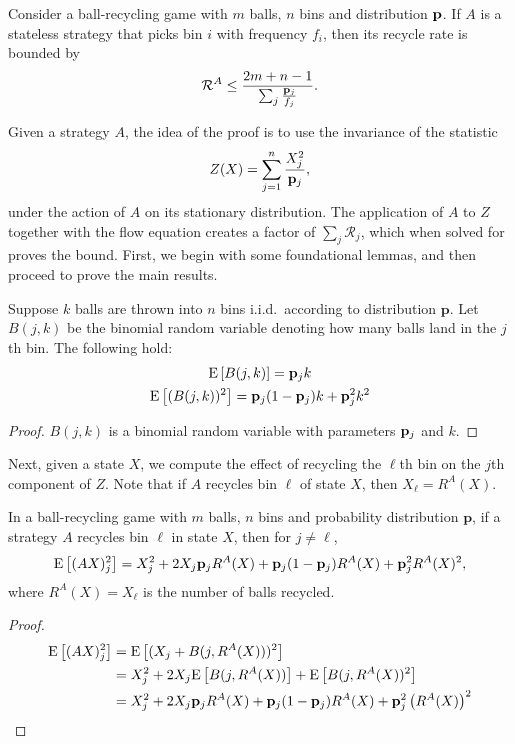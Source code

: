 \begin{lemma}\label{lem:freqbound}
	Consider a ball-recycling game with $m$ balls, $n$ bins and distribution
	$\mathbf{p}$. If $A$ is a stateless strategy that picks bin $i$ with frequency
	$f_i$, then its recycle rate is bounded by
	\begin{equation}
		\mathcal{R}^A \leq \frac{2m+n-1}{\sum_j\frac{\mathbf{p}_j}{f_j}}.
	\end{equation}
\end{lemma}

Given a strategy $A$, the idea of the proof is to use the invariance of the
statistic
\begin{equation}
	Z(X) = \sum_{j = 1}^n \frac{X_j^2}{\mathbf{p}_j},
\end{equation}
under the action of $A$ on its stationary distribution. The application of $A$
to $Z$ together with the flow equation creates a factor of $\sum_j
\mathcal{R}_j$, which when solved for proves the bound. First, we begin with
some foundational lemmas, and then proceed to prove the main results.

\begin{lemma}
	Suppose $k$ balls are thrown into $n$ bins i.i.d.\ according to distribution
	$\mathbf{p}$. Let $B(j,k)$ be the binomial random variable denoting how
	many balls land in the $j$th bin.  The following hold:
	\begin{gather}
		\mathrm{E}\left[B(j,k)\right] = \mathbf{p}_jk \\
		\mathrm{E}\left[(B(j,k))^2\right] = \mathbf{p}_j(1-\mathbf{p}_j)k + \mathbf{p}_j^2k^2
	\end{gather}
\end{lemma}

\begin{proof}
	$B(j,k)$ is a binomial random variable with parameters $\mathbf{p}_j$ and $k$.
\end{proof}

Next, given a state $X$, we compute the effect of recycling the $\ell$th bin on
the $j$th component of $Z$. Note that if $A$ recycles bin $\ell$ of state $X$,
then $X_\ell = R^A(X)$.
\begin{lemma}
	In a ball-recycling game with $m$ balls, $n$ bins and probability
	distribution $\mathbf{p}$, if a strategy $A$ recycles bin $\ell$ in state
	$X$, then for $j \neq \ell$,
        \[\mathrm{E}\left[(AX)_j^2\right]=X_j^2 + 2X_j\mathbf{p}_jR^A(X)
              + \mathbf{p}_j(1-\mathbf{p}_j)R^A(X) + \mathbf{p}_j^2R^A(X)^2, \]
	where $R^A(X) = X_\ell$ is the number of balls recycled.
\end{lemma}

\begin{proof}
   \begin{align*}
      \mathrm{E}\left[(AX)_j^2\right] &= \mathrm{E}\left[(X_j+B(j,R^A(X)))^2\right] \\
                   &= X_j^2 + 2X_j\mathrm{E}\left[B(j,R^A(X))\right] +\mathrm{E}\left[B(j,R^A(X))^2\right] \\
                   &= X_j^2 + 2X_j\mathbf{p}_jR^A(X) + \mathbf{p}_j(1-\mathbf{p}_j)R^A(X) + \mathbf{p}_j^2\left(R^A(X)\right)^2
   \end{align*}
\end{proof}

